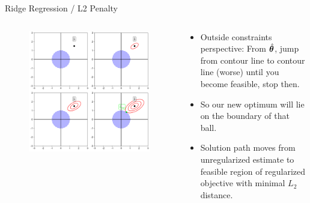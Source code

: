 \documentclass[11pt,compress,t,notes=noshow, xcolor=table]{beamer}
\begin{document}
\begin{vbframe}{Ridge Regression / L2 Penalty}
\framebreak

\begin{columns}
\begin{column}{0.5\textwidth}
\lz
\begin{figure}
\includegraphics[width=\textwidth]{figure/ridge_perspectives_01.png}
\end{figure}
\end{column}

\begin{column}{0.5\textwidth}
\begin{footnotesize} 
\lz \lz
\begin{itemize}
	\item Outside constraints perspective: From $\hat{\bm{\theta}}$, jump from contour line to contour line (worse) until you become feasible, stop then.
  \item So our new optimum will lie on the boundary of that ball.
  \item Solution path moves from unregularized estimate to feasible region of regularized objective with minimal $L_2$ distance.
\end{itemize}
\end{footnotesize}
\end{column}
\end{columns}

\framebreak


\end{vbframe}
\end{document}

